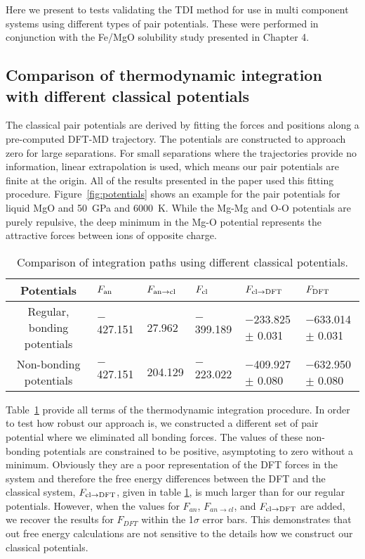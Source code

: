 Here we present to tests validating the TDI method for use in multi component systems
using different types of pair potentials. These were performed in conjunction with
the Fe/MgO solubility study presented in Chapter 4.

\subsection{Comparison of thermodynamic integration with different classical potentials}

The classical pair potentials are derived by fitting the forces and
positions along a pre-computed DFT-MD trajectory. The potentials are
constructed to approach zero for large separations. For small separations
where the trajectories provide no information, linear extrapolation is
used, which means our pair potentials are finite at the origin. All of the
results presented in the paper used this fitting procedure.
Figure~\ref{fig:potentials} shows an example for the pair potentials for
liquid MgO and 50~GPa and 6000~K.  While the Mg-Mg and O-O potentials are
purely repulsive, the deep minimum in the Mg-O potential represents the
attractive forces between ions of opposite charge.

\begin{table}[!h]
    \centering
\caption{Comparison of integration paths using different classical potentials.\label{tab:compare_pots}}
\begin{adjustbox}{max width=\textwidth}
\begin{tabular}{clllll}
\hline
Potentials & $F_{\rm an}$ & $F_{\rm an \to cl}$ & $F_{\rm cl}$ & $F_{\rm cl \to DFT}$ & $F_{\rm DFT}$ \\
\hline
Regular, bonding potentials & $-$427.151 & 27.962 & $-$399.189 & $-$233.825 $\pm$ 0.031 & $-$633.014  $\pm$ 0.031 \\
Non-bonding potentials & $-$427.151 & 204.129 & $-$223.022 & $-$409.927 $\pm$ 0.080 & $-$632.950 $\pm$ 0.080 \\
\hline
\end{tabular}
\end{adjustbox}
\end{table}

Table~\ref{tab:compare_pots} provide all terms of the thermodynamic
integration procedure. In order to test how robust our approach is, we
constructed a different set of pair potential where we eliminated all
bonding forces. The values of these non-bonding potentials are constrained
to be positive, asymptoting to zero without a minimum. Obviously they are a poor representation of the DFT forces
in the system and therefore the free energy differences between the DFT and
the classical system, $F_{\rm cl \to DFT}$, given in table
\ref{tab:compare_pots}, is much larger than for our regular potentials.
However, when the values for $F_{an}$, $F_{an \to cl}$, and $F_{\rm cl \to
DFT}$ are added, we recover the results for $F_{DFT}$ within the 1$\sigma$
error bars. This demonstrates that out free energy calculations are not
sensitive to the details how we construct our classical potentials.

